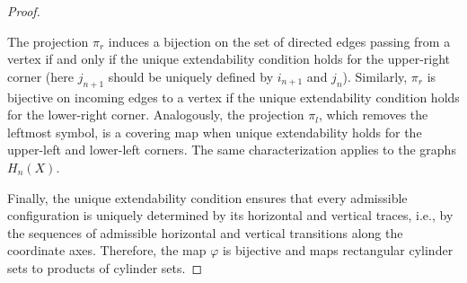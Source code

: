 \documentclass[12pt]{article}
\theoremstyle{definition}
\begin{document}
\begin{proof}
\begin{center}
\end{center}
The projection $\pi_r$ induces a bijection on the set of directed edges passing from a vertex if and only if the unique extendability condition holds for the upper-right corner (here $j_{n+1}$ should be uniquely defined by $i_{n+1}$ and $j_n$). Similarly, $\pi_r$ is bijective on incoming edges to a vertex if the unique extendability condition holds for the lower-right corner. Analogously, the projection $\pi_l$, which removes the leftmost symbol, is a covering map when unique extendability holds for the upper-left and lower-left corners.  The same characterization applies to the graphs $H_n(X)$.

Finally, the unique extendability condition ensures that every admissible configuration is uniquely determined by its horizontal and vertical traces, i.e., by the sequences of admissible horizontal and vertical transitions along the coordinate axes. Therefore, the map $\varphi$ is bijective and maps rectangular cylinder sets to products of cylinder sets.
\end{proof}
\end{document}
